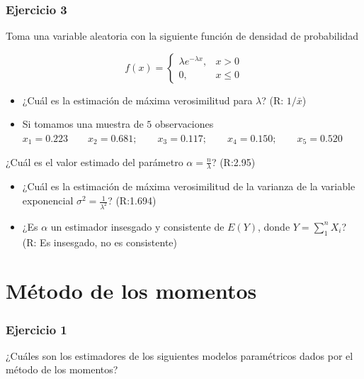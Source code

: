 \documentclass[
]{book}
\begin{document}
\hypertarget{ejercicio-3-6}{%
\subsubsection{Ejercicio 3}\label{ejercicio-3-6}}

Toma una variable aleatoria con la siguiente función de densidad de probabilidad

\[
    f(x)= 
\begin{cases}
    \lambda e^{-\lambda x},&  x > 0 \\
    0,& x\leq 0  
\end{cases}
\]

\begin{itemize}
\item
  ¿Cuál es la estimación de máxima verosimilitud para \(\lambda\)? (R: \(1/\bar{x}\))
\item
  Si tomamos una muestra de \(5\) observaciones
  \(x_1 = 0.223 \qquad x_2 = 0.681; \qquad x_3 = 0.117; \qquad x_4 = 0.150; \qquad x_5 = 0.520\)
\end{itemize}

¿Cuál es el valor estimado del parámetro \(\alpha=\frac{n}{\lambda}\)? (R:2.95)

\begin{itemize}
\item
  ¿Cuál es la estimación de máxima verosimilitud de la varianza de la variable exponencial \(\sigma^2=\frac{1}{\lambda^2}\)? (R:1.694)
\item
  ¿Es \(\alpha\) un estimador insesgado y consistente de \(E(Y)\), donde \(Y=\sum_1^n X_i\)? (R: Es insesgado, no es consistente)
\end{itemize}

\hypertarget{muxe9todo-de-los-momentos-1}{%
\section{Método de los momentos}\label{muxe9todo-de-los-momentos-1}}

\hypertarget{ejercicio-1-10}{%
\subsubsection{Ejercicio 1}\label{ejercicio-1-10}}

¿Cuáles son los estimadores de los siguientes modelos paramétricos dados por el método de los momentos?
\end{document}
